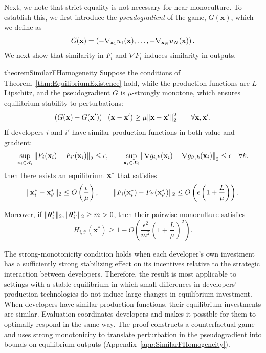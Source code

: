 Next, we note that strict equality is not necessary for near-monoculture. 
To establish this, we first introduce the \textit{pseudogradient} of the game, $G(\mathbf{x})$, which we define as 
\[
G(\mathbf{x})
=
\left(
-\nabla_{\mathbf{x}_1}u_1(\mathbf{x}),
\ldots,
-\nabla_{\mathbf{x}_N}u_N(\mathbf{x})
\right).
\]
We next show that similarity in $F_i$ and $\nabla F_i$ induces similarity in outputs.
\begin{restatable}{theorem}{SimilarFHomogeneity}
\label{thm:SimilarFHomogeneity}
Suppose the conditions of Theorem~\ref{thm:EquilibriumExistence} hold, while the production functions are $L$-Lipschitz, and the pseudogradient $G$ is $\mu$-strongly monotone, which ensures equilibrium stability to perturbations:
\[
\left(G(\mathbf{x})-G(\mathbf{x}')\right)^\top(\mathbf{x}-\mathbf{x}')
\geq
\mu\lVert\mathbf{x}-\mathbf{x}'\rVert_2^2
\qquad
\forall \mathbf{x},\mathbf{x}'.
\]
If developers $i$ and $i'$ have similar production functions in both value and gradient:
\[
\sup_{\mathbf{x}_i\in\mathcal X_i}
\left\|F_i(\mathbf{x}_i)-F_{i'}(\mathbf{x}_i)\right\|_2
\leq \epsilon,
\qquad
\sup_{\mathbf{x}_i\in\mathcal X_i}
\left\|\nabla g_{i,k}(\mathbf{x}_i)-\nabla g_{i',k}(\mathbf{x}_i)\right\|_2
\leq \epsilon
\quad \forall k.
\]
then there exists an equilibrium $\mathbf{x}^*$ that satisfies
\[
\lVert\mathbf{x}_i^*-\mathbf{x}_{i'}^*\rVert_2
\leq
O\left(\frac{\epsilon}{\mu}\right),
\qquad
\lVert F_i(\mathbf{x}_i^*)-F_{i'}(\mathbf{x}_{i'}^*)\rVert_2
\leq
O\left(\epsilon\left(1+\frac{L}{\mu}\right)\right).
\]

Moreover, if $\lVert\boldsymbol{\theta}_i^*\rVert_2,\lVert\boldsymbol{\theta}_{i'}^*\rVert_2\geq m>0$, then their pairwise monoculture satisfies
\[
H_{i,i'}(\mathbf{x}^*)
\geq
1-O\left(
\frac{\epsilon^2}{m^2}
\left(1+\frac{L}{\mu}\right)^2
\right).
\]
\end{restatable}

The strong-monotonicity condition holds when each developer's own investment has a sufficiently strong stabilizing effect on its incentives relative to the strategic interaction between developers. 
Therefore, the result is most applicable to settings with a stable equilibrium in which small differences in developers' production technologies do not induce large changes in equilibrium investment.
When developers have similar production functions, their equilibrium investments are similar.
Evaluation coordinates developers and makes it possible for them to optimally respond in the same way. 
The proof constructs a counterfactual game and uses strong monotonicity to translate perturbation in the pseudogradient into bounds on equilibrium outputs (Appendix~\ref{app:SimilarFHomogeneity}).

